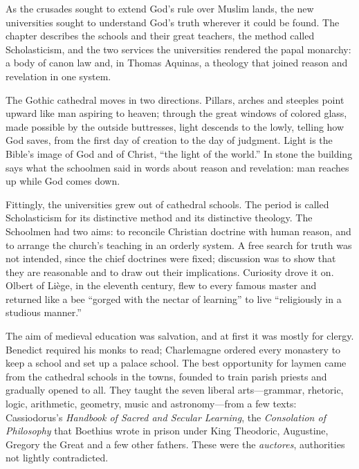 
\begin{inbrief}
As the crusades sought to extend God's rule over Muslim lands, the new universities sought to
understand God's truth wherever it could be found. The chapter describes the schools and their great
teachers, the method called Scholasticism, and the two services the universities rendered the papal
monarchy: a body of canon law and, in Thomas Aquinas, a theology that joined reason and revelation in
one system.
\end{inbrief}

The Gothic cathedral moves in two directions. Pillars, arches and steeples point upward like man
aspiring to heaven; through the great windows of colored glass, made possible by the outside
buttresses, light descends to the lowly, telling how God saves, from the first day of creation to the day of judgment. Light is the Bible's image of God and of Christ, ``the light of the world.'' In stone the building says what the schoolmen said in words about reason and revelation: man reaches up while God comes down.

Fittingly, the universities grew out of cathedral schools. The period is called Scholasticism for its
distinctive method and its distinctive theology. The Schoolmen had two aims: to reconcile Christian
doctrine with human reason, and to arrange the church's teaching in an orderly system. A free search
for truth was not intended, since the chief doctrines were fixed; discussion was to show that they are
reasonable and to draw out their implications. Curiosity drove it on. Olbert of Li\`ege, in the
eleventh century, flew to every famous master and returned like a bee ``gorged with the nectar of
learning'' to live ``religiously in a studious manner.''

The aim of medieval education was salvation, and at first it was mostly for clergy. Benedict required
his monks to read; Charlemagne ordered every monastery to keep a school and set up a palace school.
The best opportunity for laymen came from the cathedral schools in the towns, founded to train parish
priests and gradually opened to all. They taught the seven liberal arts---grammar, rhetoric, logic,
arithmetic, geometry, music and astronomy---from a few texts: Cassiodorus's \emph{Handbook of
Sacred and Secular Learning}, the \emph{Consolation of Philosophy} that Boethius wrote in prison
under King Theodoric, Augustine, Gregory the Great and a few other fathers. These were the
\emph{auctores}, authorities not lightly contradicted.

